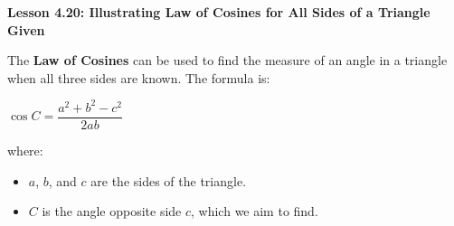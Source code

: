 \begin{center}
\textbf{Lesson 4.20: Illustrating Law of Cosines for All Sides of a Triangle Given}
\end{center}

\vspace*{-1.5ex}

The \textbf{Law of Cosines} can be used to find the measure of an angle in a triangle when all three sides are known. The formula is:  

{\centering $
\cos C = \dfrac{a^2 + b^2 - c^2}{2ab}
$\par}

\noindent where:
\begin{itemize}
    \item \(a\), \(b\), and \(c\) are the sides of the triangle.
    \item \(C\) is the angle opposite side \(c\), which we aim to find.
\end{itemize}

